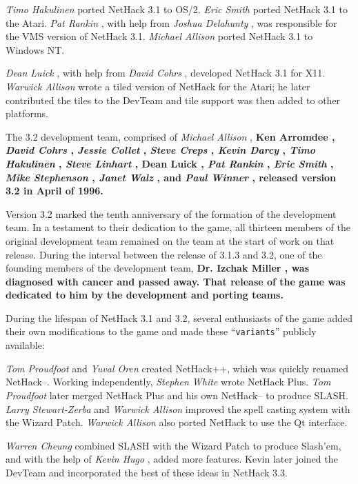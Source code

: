 %
{\it Timo Hakulinen}%
ported NetHack 3.1 to OS/2.  %
{\it Eric Smith}%
ported NetHack 3.1 to the Atari.  %
{\it Pat Rankin}%
, with help from
%
{\it Joshua Delahunty}%
, was responsible for the VMS version of NetHack 3.1.
%
{\it Michael Allison}%
ported NetHack 3.1 to Windows NT.

%
{\it Dean Luick}%
, with help from %
{\it David Cohrs}%
, developed NetHack
3.1 for X11.
%
{\it Warwick Allison}%
wrote a tiled version of NetHack for the Atari;
he later contributed the tiles to the DevTeam and tile support was
then added to other platforms.

The 3.2 development team, comprised of %
{\it Michael Allison}%
, %
\bf Ken
Arromdee\rm%
, %
{\it David Cohrs}%
, %
{\it Jessie Collet}%
, %
{\it Steve Creps}%
,
%
{\it Kevin Darcy}%
, %
{\it Timo Hakulinen}%
, %
{\it Steve Linhart}%
, %
\bf Dean
Luick\rm%
, %
{\it Pat Rankin}%
, %
{\it Eric Smith}%
, %
{\it Mike Stephenson}%
,
%
{\it Janet Walz}%
, and %
{\it Paul Winner}%
, released version 3.2 in April of
1996.

Version 3.2 marked the tenth anniversary of the formation of the development
team.  In a testament to their dedication to the game, all thirteen members
of the original development team remained on the team at the start of work
on that release.  During the interval between the release of 3.1.3
and 3.2, one of the founding members of the development team, %
\bf Dr. Izchak
Miller\rm%
, was diagnosed with cancer and passed away.  That release of the
game was dedicated to him by the development and porting teams.

During the lifespan of NetHack 3.1 and 3.2, several enthusiasts
of the game added
their own modifications to the game and made these ``{\tt variants}'' publicly
available:

%
{\it Tom Proudfoot}%
and %
{\it Yuval Oren}%
created NetHack++,
which was quickly renamed NetHack--.
Working independently, %
{\it Stephen White}%
wrote NetHack Plus.
%
{\it Tom Proudfoot}%
later merged NetHack Plus
and his own NetHack-- to produce SLASH.
%
{\it Larry Stewart-Zerba}%
and %
{\it Warwick Allison}%
improved the spell
casting system with the Wizard Patch.
%
{\it Warwick Allison}%
also ported NetHack to use the Qt interface.

%
{\it Warren Cheung}%
combined SLASH with the Wizard Patch to produce Slash'em,
and with the help of %
{\it Kevin Hugo}%
, added more features.
Kevin later joined the
DevTeam and incorporated the best of these ideas in NetHack 3.3.

